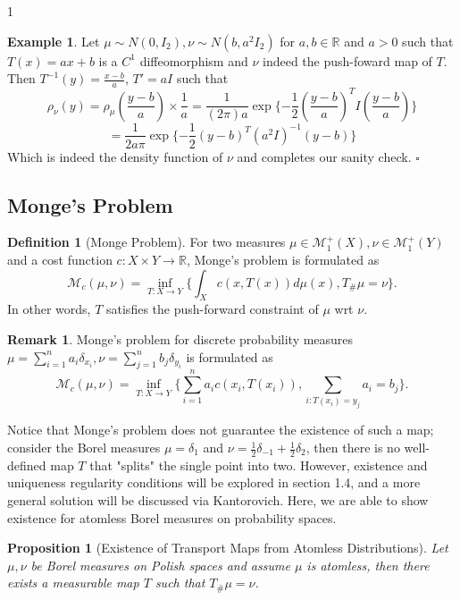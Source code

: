 \documentclass[12pt]{article}
\newtheorem{proposition}[theorem]{Proposition}
\theoremstyle{definition}
\newtheorem{definition}[theorem]{Definition}
\newtheorem*{example}{Example}
\newtheorem*{remark}{Remark}
\theoremstyle{plain}
\begin{document}
\begin{spacing}{1}
\begin{example}
    Let $\mu \sim N(0, I_2), \nu \sim N(b, a^2I_2)$ for $a, b \in \mathbb{R}$ and $a > 0$ such that $T(x) = ax + b$ is a $C^1$ diffeomorphism and $\nu$ indeed the push-foward map of $T$. Then $T^{-1}(y) = \frac{x - b}{a}$, $T' = aI$ such that
    \[
    \rho_\nu(y) = \rho_\mu(\frac{y - b}{a}) \times \frac{1}{a} = \frac{1}{(2\pi)a} \exp\{-\frac{1}{2}(\frac{y - b}{a})^T I (\frac{y - b}{a})\}
    \]
    \[
    = \frac{1}{2a\pi}\exp\{-\frac{1}{2}(y-b)^T (a^2I)^{-1} (y - b)\}
    \]
    Which is indeed the density function of $\nu$ and completes our sanity check. \hfill \(\square\)
\end{example}

\subsection{Monge's Problem}
\begin{definition}[Monge Problem]
For two measures $\mu \in \mathcal{M}_1^+(X), \nu \in \mathcal{M}_1^+(Y)$ and a cost function $c: X \times Y \rightarrow \mathbb{R}$, Monge's problem is formulated as
\[
\mathcal{M}_c(\mu, \nu) = \inf_{T: X \rightarrow Y} \{\int_X c(x, T(x))d\mu(x), T_\#\mu = \nu\}.
\]
In other words, $T$ satisfies the push-forward constraint of $\mu$ wrt $\nu$.
\end{definition}

\begin{remark}
    Monge's problem for discrete probability measures $\mu = \sum_{i = 1}^n a_i \delta_{x_i}, \nu = \sum_{j = 1}^n b_j \delta_{y_i}$ is formulated as
    \[
    \mathcal{M}_c(\mu, \nu) = \inf_{T: X \rightarrow Y} \{\sum_{i = 1}^n a_ic(x_i, T(x_i)), \sum_{i: T(x_i) = y_j} a_i = b_j\}.
    \]
\end{remark}

Notice that Monge's problem does not guarantee the existence of such a map; consider the Borel measures $\mu = \delta_1$ and $\nu = \frac{1}{2}\delta_{-1} + \frac{1}{2}\delta_2$, then there is no well-defined map $T$ that "splits" the single point into two. However, existence and uniqueness regularity conditions will be explored in section 1.4, and a more general solution will be discussed via Kantorovich. Here, we are able to show existence for atomless Borel measures on probability spaces.

\begin{proposition}[Existence of Transport Maps from Atomless Distributions]
    Let $\mu, \nu$ be Borel measures on Polish spaces and assume $\mu$ is atomless, then there exists a measurable map $T$ such that $T_\# \mu = \nu$.
\end{proposition}


\end{spacing}
\end{document}
